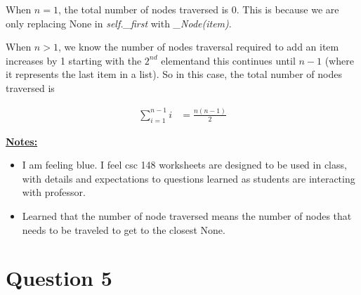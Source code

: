 \documentclass[12pt]{article}
\begin{document}
\begin{enumerate}[a.]
\begin{mdframed}
        \bigskip

        When $n = 1$, the total number of nodes traversed is 0. This is because
        we are only replacing None in \textit{self.\_first} with \textit{\_Node(item)}.

        \bigskip

        When \color{red}$n > 1$, we know the number of nodes traversal
        required to add an item increases by 1 starting with the $2^{nd}$
        element\color{black}\:and this continues until $n - 1$ (where it represents
        the last item in a list). So in this case, the total number of nodes traversed is

        \begin{align}
            \sum\limits_{i=1}^{n-1} i &= \frac{n(n-1)}{2}
        \end{align}
    \end{mdframed}

    \bigskip

    \underline{\textbf{Notes:}}

    \bigskip

    \begin{itemize}
        \item I am feeling blue. I feel csc 148 worksheets are designed
        to be used in class, with details and expectations to questions
        learned as students are interacting with professor.

        \item Learned that the number of node traversed means the
        number of nodes that needs to be traveled to get to the closest None.

        \bigskip

    \end{itemize}


\end{enumerate}

\section*{Question 5}
\end{document}
